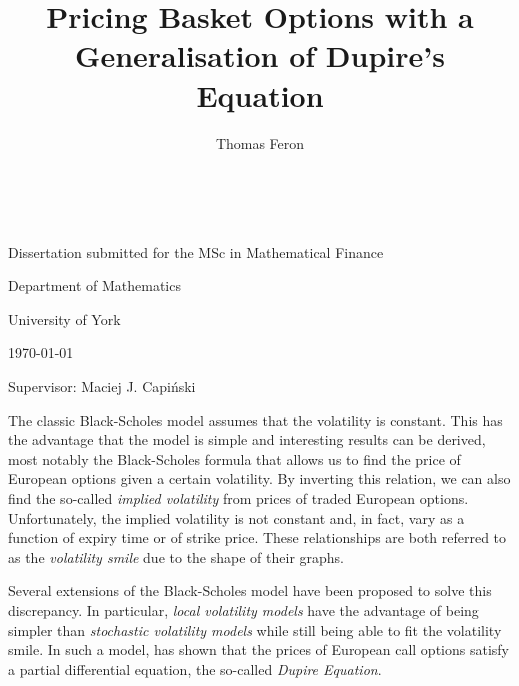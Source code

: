 \documentclass[english]{article}
\numberwithin{equation}{section}
\numberwithin{figure}{section}
\theoremstyle{bolddescit}
\theoremstyle{definition}
\theoremstyle{definition}
\theoremstyle{plain}
\theoremstyle{plain}
\theoremstyle{bolddesc}
\theoremstyle{plain}
\theoremstyle{remark}
\begin{document}
\title{Pricing Basket Options with a Generalisation of Dupire's Equation}
\author{Thomas Feron}
\date{~}

\maketitle
\vspace{2.5in}

\noindent \begin{center}
Dissertation submitted for the MSc in Mathematical Finance
\par\end{center}

\begin{center}
\bigskip{}
\par\end{center}

\begin{center}
Department of Mathematics

University of York\bigskip{}
\par\end{center}

\begin{center}
\today
\par\end{center}

\vspace{1in}

\begin{center}
Supervisor: Maciej J. Capi\'nski
\par\end{center}

\newpage{}

\tableofcontents{}\newpage{}

\pagebreak

The classic Black-Scholes model assumes that the volatility is constant. This has the advantage that the model is simple and interesting results can be derived, most notably the Black-Scholes formula that allows us to find the price of European options given a certain volatility. By inverting this relation, we can also find the so-called \textit{implied volatility} from prices of traded European options. Unfortunately, the implied volatility is not constant and, in fact, vary as a function of expiry time or of strike price. These relationships are both referred to as the \textit{volatility smile} due to the shape of their graphs.

Several extensions of the Black-Scholes model have been proposed to solve this discrepancy. In particular, \textit{local volatility models} have the advantage of being simpler than \textit{stochastic volatility models} while still being able to fit the volatility smile. In such a model, \textcite{dupire_pricing_1993} has shown that the prices of European call options satisfy a partial differential equation, the so-called \textit{Dupire Equation}.
\end{document}
